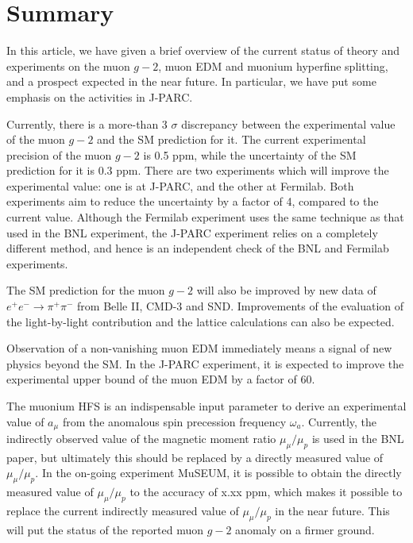 \section{Summary}

In this article, we have given a brief overview of the
current status of theory and experiments on the muon $g-2$,
muon EDM and muonium hyperfine splitting, and a prospect
expected in the near future.  In particular, we have put
some emphasis on the activities in J-PARC.

Currently, there is a more-than 3 $\sigma$ discrepancy
between the experimental value of the muon $g-2$ and the
SM prediction for it.  The current experimental precision
of the muon $g-2$ is 0.5 ppm, while the uncertainty of
the SM prediction for it is 0.3 ppm.  There are two
experiments which will improve the experimental value:
one is at J-PARC, and the other at Fermilab.  Both
experiments aim to reduce the uncertainty by a factor
of 4, compared to the current value.  Although the Fermilab
experiment uses the same technique as that used in the BNL
experiment, the J-PARC experiment relies on a completely
different method, and hence is an independent check of the
BNL and Fermilab experiments.  

The SM prediction for the muon $g-2$ will also be improved
by new data of $e^+ e^- \to \pi^+\pi^-$ from Belle II, CMD-3
and SND.  Improvements of the evaluation of the light-by-light
contribution and the lattice calculations can also be expected.

Observation of a non-vanishing muon EDM immediately means
a signal of new physics beyond the SM.  In the J-PARC
experiment, it is expected to improve the experimental
upper bound of the muon EDM by a factor of 60.

The muonium HFS is an indispensable input parameter to
derive an experimental value of $a_\mu$ from the 
anomalous spin precession frequency $\omega_a$.
Currently, the indirectly observed value of the 
magnetic moment ratio $\mu_\mu/\mu_p$ is used in the
BNL paper, but ultimately this should be replaced by
a directly measured value of $\mu_\mu/\mu_p$.  In the
on-going experiment MuSEUM, it is possible to obtain
the directly measured value of $\mu_\mu/\mu_p$ to the
accuracy of x.xx ppm, which makes it possible to
replace the current indirectly measured value of
$\mu_\mu/\mu_p$ in the near future.  This will put the
status of the reported muon $g-2$ anomaly on a firmer
ground. 

